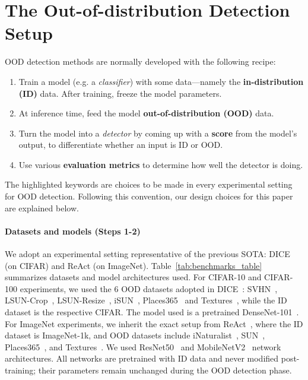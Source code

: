 \documentclass{article}
\newcommand{\seclabel}[1]{\label{sec:#1}}
\newcommand{\tabref}[1]{Table~\ref{tab:#1}}
\begin{document}
\section{The Out-of-distribution Detection Setup}
\seclabel{setup}

OOD detection methods are normally developed with the following recipe:
\begin{enumerate}
\item Train a model (e.g. a \textit{classifier}) with some data---namely the \textbf{in-distribution (ID)} data. After training, freeze the model parameters.
\item At inference time, feed the model \textbf{out-of-distribution (OOD)} data. 
\item Turn the model into a \textit{detector} by coming up with a \textbf{score} from the model's output, to differentiate whether an input is ID or OOD.
\item Use various \textbf{evaluation metrics} to determine how well the detector is doing.
\end{enumerate}

The highlighted keywords are choices to be made in every experimental setting for OOD detection. Following this convention, our design choices for this paper are explained below.


\paragraph{Datasets and models (Steps 1-2)}
We adopt an experimental setting representative of the previous SOTA: DICE (on CIFAR) and ReAct (on ImageNet). \tabref{benchmarks_table} summarizes datasets and model architectures used. For CIFAR-10 and CIFAR-100 experiments, we used the 6 OOD datasets adopted in DICE~\citep{sun2022dice}: SVHN~\citep{netzer2011reading}, LSUN-Crop~\citep{yu2015lsun}, LSUN-Resize~\citep{yu2015lsun}, iSUN~\citep{xu2015turkergaze}, Places365~\citep{zhou2017places} and Textures~\citep{cimpoi2014describing}, while the ID dataset is the respective CIFAR. The model used is a pretrained DenseNet-101~\citep{huang2017densely}.
For ImageNet experiments, we inherit the exact setup from ReAct~\citep{react}, where the ID dataset is ImageNet-1k, and OOD datasets include iNaturalist~\citep{van2018inaturalist}, SUN~\citep{xiao2010sun}, Places365~\citep{zhou2017places}, and Textures~\citep{cimpoi2014describing}. We used ResNet50~\citep{he2016deep} and MobileNetV2~\citep{sandler2018mobilenetv2} network architectures. All networks are pretrained with ID data and never modified post-training; their parameters remain unchanged during the OOD detection phase.
\end{document}
